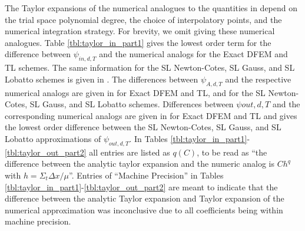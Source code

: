 The Taylor expansions of the numerical analogues to the quantities in  depend on the trial space polynomial degree, the choice of interpolatory points, and the numerical integration strategy. 
For brevity, we omit giving these numerical analogues.
Table \ref{tbl:taylor_in_part1} gives the lowest order term for the difference between  $\psi_{in,d,T}$ and the numerical analogs
for the Exact DFEM and TL schemes.  
The same information for the SL Newton-Cotes, SL Gauss, and SL Lobatto schemes is given in .
The differences between $\psi_{A,d,T}$ and the respective numerical analogs are given in  for Exact DFEM and TL,
and  for the SL Newton-Cotes, SL Gauss, and SL Lobatto schemes.
Differences between $\psi{out,d,T}$ and the corresponding numerical analogs are given in  for Exact DFEM and TL  and 
 gives the lowest order difference between the SL Newton-Cotes, SL Gauss, and SL Lobatto approximations of $\psi_{out,d,T}$.
In Tables \ref{tbl:taylor_in_part1}-\ref{tbl:taylor_out_part2} all entries are listed as
$q(C)$, to be read as ``the difference between the analytic taylor expansion and the numeric analog is $C h^q$ with $h=\Sigma_t \Delta x / \mu$''.
Entries of ``Machine Precision'' in Tables \ref{tbl:taylor_in_part1}-\ref{tbl:taylor_out_part2} are meant to indicate that the difference between
the analytic Taylor expansion and Taylor expansion of the numerical approximation was inconclusive due to all coefficients being within machine precision.
